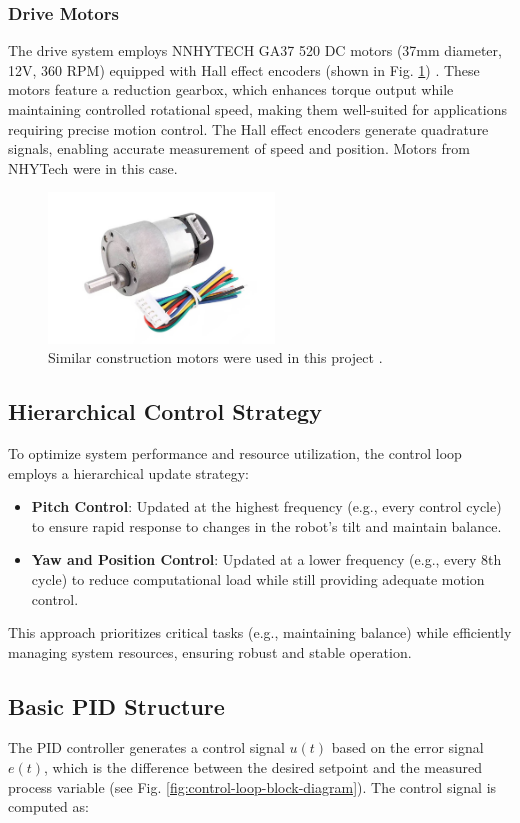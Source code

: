 \subsubsection{Drive Motors}
The drive system employs NNHYTECH GA37 520 DC motors (37mm diameter, 12V, 360 RPM) equipped with Hall effect encoders (shown in Fig. \ref{fig:dc-motor}) \cite{dc_motor}. These motors feature a reduction gearbox, which enhances torque output while maintaining controlled rotational speed, making them well-suited for applications requiring precise motion control. The Hall effect encoders generate quadrature signals, enabling accurate measurement of speed and position. Motors from NHYTech were in this case.
\begin{figure}[H]
	\centering
	\includegraphics[height=4cm]{assets/dc-motor-with-encoder.jpg}
	\caption{Similar construction motors were used in this project \cite{dc_motor}.}
	\label{fig:dc-motor}
\end{figure}

\subsection{Hierarchical Control Strategy}
To optimize system performance and resource utilization, the control loop employs a hierarchical update strategy:
\begin{itemize}
	\item \textbf{Pitch Control}: Updated at the highest frequency (e.g., every control cycle) to ensure rapid response to changes in the robot's tilt and maintain balance.
	\item \textbf{Yaw and Position Control}: Updated at a lower frequency (e.g., every 8th cycle) to reduce computational load while still providing adequate motion control.
\end{itemize}

This approach prioritizes critical tasks (e.g., maintaining balance) while efficiently managing system resources, ensuring robust and stable operation.


\subsection{Basic PID Structure}
The PID controller generates a control signal $u(t)$ based on the error signal $e(t)$, which is the difference between the desired setpoint and the measured process variable (see Fig. \ref{fig:control-loop-block-diagram}). The control signal is computed as:

